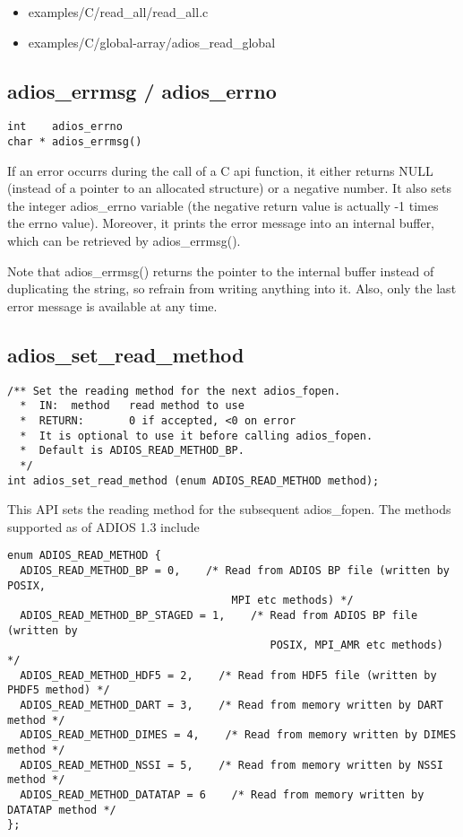 \begin{itemize}
\renewcommand{\labelitemi}{$-$}
\item examples/C/read\_all/read\_all.c

\item examples/C/global-array/adios\_read\_global\label{HToc182553399}
\end{itemize}

\subsection{adios\_errmsg / adios\_errno}

\begin{lstlisting}[]
int    adios_errno
char * adios_errmsg()
\end{lstlisting}

If an error occurrs during the call of a C api function, it either returns NULL 
(instead of a pointer to an allocated structure) or a negative number. It also 
sets the integer adios\_errno variable (the negative return value is actually -1 
times the errno value). Moreover, it prints the error message into an internal 
buffer, which can be retrieved by adios\_errmsg(). 

Note that adios\_errmsg() returns the pointer to the internal buffer instead of 
duplicating the string, so refrain from writing anything into it. Also, only the 
last error message is available at any time.\label{HToc182553400}

\subsection{adios\_set\_read\_method}
\begin{lstlisting}[]
/** Set the reading method for the next adios_fopen.
  *  IN:  method   read method to use
  *  RETURN:       0 if accepted, <0 on error
  *  It is optional to use it before calling adios_fopen. 
  *  Default is ADIOS_READ_METHOD_BP.
  */
int adios_set_read_method (enum ADIOS_READ_METHOD method);
\end{lstlisting}

This API sets the reading method for the subsequent adios\_fopen. The methods supported 
as of ADIOS 1.3 include

\begin{lstlisting}[]
enum ADIOS_READ_METHOD {
  ADIOS_READ_METHOD_BP = 0,    /* Read from ADIOS BP file (written by POSIX,
                                   MPI etc methods) */
  ADIOS_READ_METHOD_BP_STAGED = 1,    /* Read from ADIOS BP file (written by
                                         POSIX, MPI_AMR etc methods) */
  ADIOS_READ_METHOD_HDF5 = 2,    /* Read from HDF5 file (written by PHDF5 method) */
  ADIOS_READ_METHOD_DART = 3,    /* Read from memory written by DART method */
  ADIOS_READ_METHOD_DIMES = 4,    /* Read from memory written by DIMES method */
  ADIOS_READ_METHOD_NSSI = 5,    /* Read from memory written by NSSI method */
  ADIOS_READ_METHOD_DATATAP = 6    /* Read from memory written by DATATAP method */
};
\end{lstlisting}

